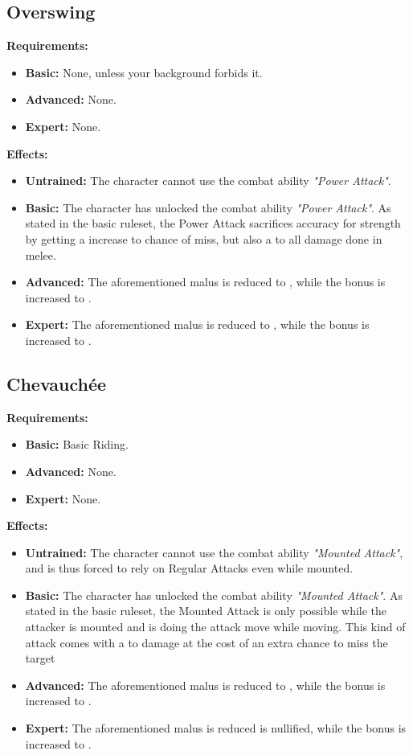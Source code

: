 \documentclass[openany,10pt,a4paper]{book}
\begin{document}
\subsection{Overswing}
\textbf{Requirements:}
\begin{itemize}
	\item \textbf{Basic:} None, unless your background forbids it.
	\item \textbf{Advanced:} None.
	\item \textbf{Expert:} None.
\end{itemize}
\textbf{Effects:}
\begin{itemize}
	\item \textbf{Untrained:} The character cannot use the combat ability \textit{"Power Attack"}.
	\item \textbf{Basic:} The character has unlocked the combat ability \textit{"Power Attack"}. As stated in the basic ruleset, the Power Attack sacrifices accuracy for strength by getting a  increase to chance of miss, but also a  to all damage done in melee.
	\item \textbf{Advanced:} The aforementioned malus is reduced to , while the bonus is increased to .
	\item \textbf{Expert:} The aforementioned malus is reduced to , while the bonus is increased to .
\end{itemize}\newpage
\subsection{Chevauchée}
\textbf{Requirements:}
\begin{itemize}
	\item \textbf{Basic:} Basic Riding.
	\item \textbf{Advanced:} None.
	\item \textbf{Expert:} None.
\end{itemize}
\textbf{Effects:}
\begin{itemize}
	\item \textbf{Untrained:} The character cannot use the combat ability \textit{"Mounted Attack"}, and is thus forced to rely on Regular Attacks even while mounted.
	\item \textbf{Basic:} The character has unlocked the combat ability \textit{"Mounted Attack"}. As stated in the basic ruleset, the Mounted Attack is only possible while the attacker is mounted and is doing the attack move while moving. This kind of attack comes with a  to damage at the cost of an extra  chance to miss the target
	\item \textbf{Advanced:} The aforementioned malus is reduced to , while the bonus is increased to .
	\item \textbf{Expert:} The aforementioned malus is reduced is nullified, while the bonus is increased to .
\end{itemize}\newpage
\end{document}
